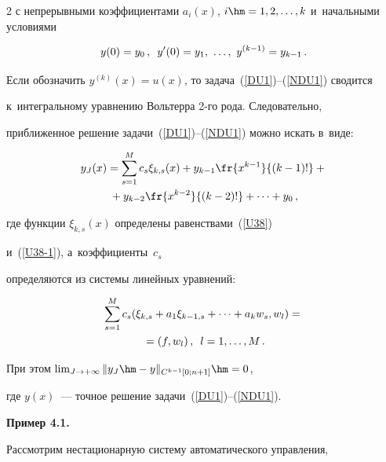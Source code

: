\begin{multicols}{2}
с непрерывными коэффициентами $a_i(x)$, $i\hm=1,2,\dots,k$ и~начальными условиями


\begin{equation}


\label{NDU1}


y(0)=y_0\,,\enskip y'(0)=y_1,\ \dots,\ y^{(k-1)}=y_{k-1}\,.


\end{equation}


Если обозначить $y^{(k)}(x)=u(x)$, то задача~(\ref{DU1})--(\ref{NDU1}) сводится 


к~интегральному уравнению Вольтерра \mbox{2-го} рода. Следовательно, 


приближенное решение задачи~(\ref{DU1})--(\ref{NDU1}) можно искать в~виде:


\begin{multline*}


y_J(x)=\sum\limits_{s=1}^M c_s {\xi}_{k,s}(x) +y_{k-1}\fr{x^{k-1}}{(k-1)!}+{}\\


{}+y_{k-2}\fr{x^{k-2}}{(k-2)!}+\dots+y_0\,,


\end{multline*}


где функции ${\xi}_{k,s}(x)$ определены равенствами~(\ref{U38})


и~(\ref{U38-1}), а~коэффициенты~$c_s$ 


определяются из системы линейных уравнений:


\begin{multline*}


\sum\limits_{s=1}^M c_s ({\xi}_{k,s}+a_1 {\xi}_{k-1,s}+\dots +a_k w_s,w_l)={}\\


{}=\left(f,w_l\right),\enskip l=1,\dots,M\,.


\end{multline*}


При этом $\lim\nolimits_{J\to +\infty} \|y_J\hm-y\|_{C^{k-1}[0;n+1]}\hm=0$, 


где $y(x)$~--- точное решение задачи~(\ref{DU1})--(\ref{NDU1}).











\noindent


\textbf{Пример 4.1.}\


Рассмотрим нестационарную систему автоматического управления, 



\end{multicols}

